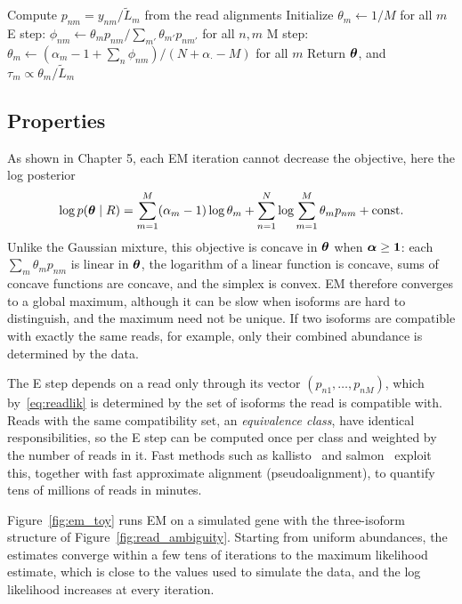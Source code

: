 \begin{algorithm}[!htbp]
  \caption{EM for isoform abundance}
  \label{alg:em}
  \begin{algorithmic}[1]
    \State Compute $p_{nm}=y_{nm}/\tilde L_m$ from the read alignments
    \State Initialize $\theta_m\gets 1/M$ for all $m$
    \Repeat
      \State E step: $\phi_{nm}\gets\theta_m p_{nm}/\sum_{m'}\theta_{m'}p_{nm'}$ for all $n,m$
      \State M step: $\theta_m\gets(\alpha_m-1+\sum_n\phi_{nm})/(N+\alpha_\cdot-M)$ for all $m$
    \State Return $\boldsymbol{\theta}$, and $\tau_m\propto\theta_m/\tilde L_m$
  \end{algorithmic}
\end{algorithm}

\subsection{Properties}

As shown in Chapter 5, each EM iteration cannot decrease the objective, here the log posterior
\begin{equation}
  \log p(\boldsymbol{\theta}\mid R) = \sum_{m=1}^M(\alpha_m-1)\log\theta_m + \sum_{n=1}^N\log\sum_{m=1}^M\theta_m p_{nm} + \text{const}.
\end{equation}
Unlike the Gaussian mixture, this objective is concave in $\boldsymbol{\theta}$ when $\boldsymbol{\alpha}\geq\mathbf{1}$: each $\sum_m\theta_m p_{nm}$ is linear in $\boldsymbol{\theta}$, the logarithm of a linear function is concave, sums of concave functions are concave, and the simplex is convex. EM therefore converges to a global maximum, although it can be slow when isoforms are hard to distinguish, and the maximum need not be unique. If two isoforms are compatible with exactly the same reads, for example, only their combined abundance is determined by the data.

The E step depends on a read only through its vector $(p_{n1},\dots,p_{nM})$, which by~\eqref{eq:readlik} is determined by the set of isoforms the read is compatible with. Reads with the same compatibility set, an \emph{equivalence class}, have identical responsibilities, so the E step can be computed once per class and weighted by the number of reads in it. Fast methods such as kallisto~\citep{bray2016} and salmon~\citep{patro2017} exploit this, together with fast approximate alignment (pseudoalignment), to quantify tens of millions of reads in minutes.

Figure~\ref{fig:em_toy} runs EM on a simulated gene with the three-isoform structure of Figure~\ref{fig:read_ambiguity}. Starting from uniform abundances, the estimates converge within a few tens of iterations to the maximum likelihood estimate, which is close to the values used to simulate the data, and the log likelihood increases at every iteration.

